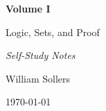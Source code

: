 \begin{titlepage}
\centering

\vspace*{5cm}

{\Huge\bfseries Volume I\par}

\vspace{0.5cm}

{\LARGE Logic, Sets, and Proof\par}

\vspace{0.5cm}

{\large\itshape Self-Study Notes\par}

\vfill

{\large William Sollers\par}

\vspace{0.5cm}

{\large \today\par}

\end{titlepage}
